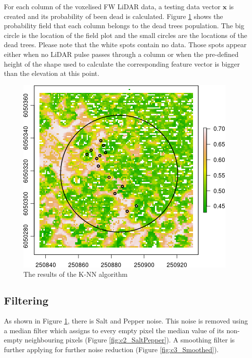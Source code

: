 \documentclass{subfiles}
\begin{document}
\par For each column of the voxelised FW LiDAR data, a testing data vector $\boldsymbol{x}$ is created and its probability of been dead is calculated. Figure \ref{fig:c1_knn} shows the probability field that each column belongs to the dead trees population. The big circle is the location of the field plot and the small circles are the locations of the dead trees. Please note that the white spots contain no data. Those spots appear either when no LiDAR pulse passes through a column or when the pre-defined height of the shape used to calculate the corresponding feature vector is bigger than the elevation at this point. 

 				\begin{figure} [h!]			
 					\centering
 					\includegraphics[width=.49\textwidth]{img/dead/c1_knn}
 					\caption{The results of the K-NN algorithm} 
 					\label{fig:c1_knn}
 				\end{figure}

 
 
  \subsection{Filtering}\label{sec:filtering}
  As shown in Figure \ref{fig:c1_knn}, there is Salt and Pepper noise. This noise is removed using a median filter which assigns to every empty pixel the median value of its non-empty neighbouring pixels  (Figure \ref{fig:c2_SaltPepper}). A smoothing filter is further applying for further noise reduction (Figure \ref{fig:c3_Smoothed}). 
\end{document}
